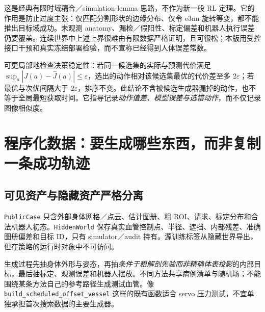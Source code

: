 \documentclass[UTF8,fontset=fandol,11pt,a4paper]{ctexart}
\theoremstyle{plain}
\theoremstyle{definition}
\theoremstyle{remark}
\numberwithin{equation}{section}
\newcommand{\code}[1]{\begingroup\small\nolinkurl{#1}\endgroup}
\begin{document}
这是经典有限时域耦合／simulation-lemma 思路，不作为新一般 RL 定理。它的作用是防止过度主张：仅匹配分割形状的边缘分布、仅令 e3nn 旋转等变，都不能推出目标域成功。未观测 anatomy、漏检／假阳性、标定偏差和机器人执行误差仍要覆盖。连续世界中上述上界很难由有限数据严格证明，且可很松；本版用受控接口干预和真实冻结部署检验，而不宣称已经得到人体误差常数。

可更局部地检查决策稳定性：若同一候选集的实际与预测代价满足 $\sup_a|J(a)-\widehat J(a)|\le\varepsilon$，选出的动作相对该候选集最优的代价差至多 $2\varepsilon$；若最优与次优间隔大于 $2\varepsilon$，排序不变。此结论不含被候选生成器漏掉的动作，也不等于全局最短获取时间。它指导记录\emph{动作值差、模型误差与选错动作}，而不仅记录图像相似度。

\section{程序化数据：要生成哪些东西，而非复制一条成功轨迹}
\label{sec:data}
\subsection{可见资产与隐藏资产严格分离}
\code{PublicCase} 只含外部身体网格／点云、估计图册、粗 ROI、请求、标定分布和合法机器人初态。\code{HiddenWorld} 保存真实血管控制点、半径、遮挡、内部残差、准确图册偏差和目标 ID，只有 simulator／audit 持有。源训练标签从隐藏世界导出，但在策略的运行时对象中不可访问。

生成过程先抽身体外形与姿态，再抽\emph{条件于粗解剖先验而非精确体表投影}的内部目标，最后抽标定、观测误差和机器人摆放。不同方法共享病例清单与随机场；不能围绕某条方法自己的参考路径生成测试血管。像 \code{build_scheduled_offset_vessel} 这样的既有函数适合 servo 压力测试，不宜单独承担首次搜索数据的主要生成器。
\end{document}
